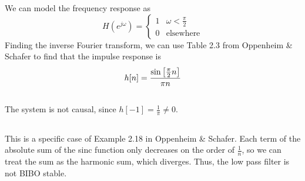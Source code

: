 \documentclass{article}
\begin{document}
We can model the frequency response as
\begin{equation}
    H(e^{j \omega}) =
    \begin{cases}
        1 & \omega < \frac{\pi}{2} \\
        0 & \text{elsewhere}
    \end{cases}
\end{equation}
Finding the inverse Fourier transform, we can use Table 2.3 from Oppenheim \& Schafer to find that the impulse response is
\begin{equation}
    h[n] = \frac{\sine\left[\frac{\pi}{2} n\right]}{\pi n}
\end{equation}

\subsection{}

The system is not causal, since \(h[-1] = \frac{1}{\pi} \neq 0\).

\subsection{}

This is a specific case of Example 2.18 in Oppenheim \& Schafer.
Each term of the absolute sum of the sinc function only decreases on the order of \(\frac{1}{n}\), so we can treat the sum as the harmonic sum, which diverges.
Thus, the low pass filter is not BIBO stable.
\end{document}
